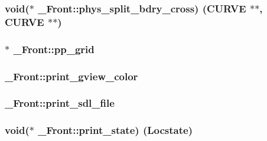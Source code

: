 \subsubsection[{\texorpdfstring{phys\+\_\+split\+\_\+bdry\+\_\+cross}{phys_split_bdry_cross}}]{\setlength{\rightskip}{0pt plus 5cm}void($\ast$ \+\_\+\+Front\+::phys\+\_\+split\+\_\+bdry\+\_\+cross) ({\bf C\+U\+R\+VE} $\ast$$\ast$, {\bf C\+U\+R\+VE} $\ast$$\ast$)}\hypertarget{struct___front_ab6b4cfd6332901dd84b070c2f852e922}{}\label{struct___front_ab6b4cfd6332901dd84b070c2f852e922}
\subsubsection[{\texorpdfstring{pp\+\_\+grid}{pp_grid}}]{$\ast$ \+\_\+\+Front\+::pp\+\_\+grid}\hypertarget{struct___front_a6f24ab73c5e8b24bd28cb26e9228f4c9}{}\label{struct___front_a6f24ab73c5e8b24bd28cb26e9228f4c9}
\subsubsection[{\texorpdfstring{print\+\_\+gview\+\_\+color}{print_gview_color}}]{ \+\_\+\+Front\+::print\+\_\+gview\+\_\+color}\hypertarget{struct___front_a1766be63b09647462693fb8751130e84}{}\label{struct___front_a1766be63b09647462693fb8751130e84}
\subsubsection[{\texorpdfstring{print\+\_\+sdl\+\_\+file}{print_sdl_file}}]{ \+\_\+\+Front\+::print\+\_\+sdl\+\_\+file}\hypertarget{struct___front_a96bc68270a48f131e100b2c6a6cc4ac4}{}\label{struct___front_a96bc68270a48f131e100b2c6a6cc4ac4}
\subsubsection[{\texorpdfstring{print\+\_\+state}{print_state}}]{\setlength{\rightskip}{0pt plus 5cm}void($\ast$ \+\_\+\+Front\+::print\+\_\+state) ({\bf Locstate})}\hypertarget{struct___front_a095a0e8a4f300ac16c2c735edfb42a32}{}\label{struct___front_a095a0e8a4f300ac16c2c735edfb42a32}
